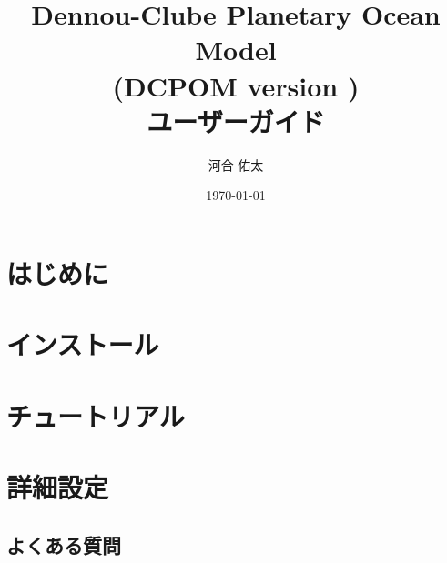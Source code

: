 \documentclass[a4j,12pt,openbib,oneside]{jreport}
\title{{\LARGE Dennou-Clube Planetary Ocean Model \\
              (DCPOM version \version) \\
               ユーザーガイド}}
\author{河合 佑太}
\date{\today}
\begin{document}
\maketitle
\tableofcontents

\chapter{はじめに}\label{intro}


\chapter{インストール}\label{install}


\chapter{チュートリアル}\label{tutorial}
%

\chapter{詳細設定}\label{setting_detail}

\renewcommand{\bibname}{参考文献}


\begin{appendix}
  \chapter{よくある質問}  
\end{appendix}
\end{document}
